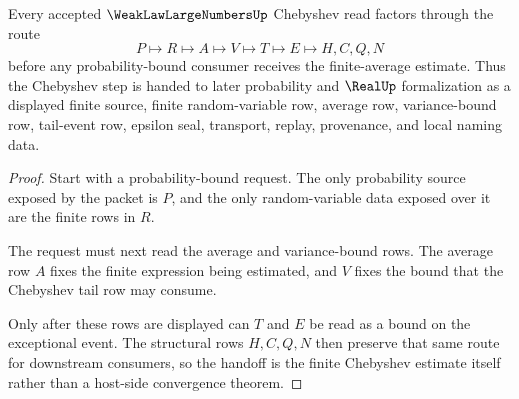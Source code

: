 \begin{theorem}\label{thm:weak-law-large-numbers-chebyshev-handoff}
Every accepted $\WeakLawLargeNumbersUp$ Chebyshev read factors through the route
$$
P\longmapsto R\longmapsto A\longmapsto V\longmapsto T\longmapsto E\longmapsto H,C,Q,N
$$
before any probability-bound consumer receives the finite-average estimate. Thus the Chebyshev step is handed to later probability and $\RealUp$ formalization as a displayed finite source, finite random-variable row, average row, variance-bound row, tail-event row, epsilon seal, transport, replay, provenance, and local naming data.
\end{theorem}
\begin{proof}
Start with a probability-bound request. The only probability source exposed by the packet is $P$, and the only random-variable data exposed over it are the finite rows in $R$.

The request must next read the average and variance-bound rows. The average row $A$ fixes the finite expression being estimated, and $V$ fixes the bound that the Chebyshev tail row may consume.

Only after these rows are displayed can $T$ and $E$ be read as a bound on the exceptional event. The structural rows $H,C,Q,N$ then preserve that same route for downstream consumers, so the handoff is the finite Chebyshev estimate itself rather than a host-side convergence theorem.
\end{proof}

